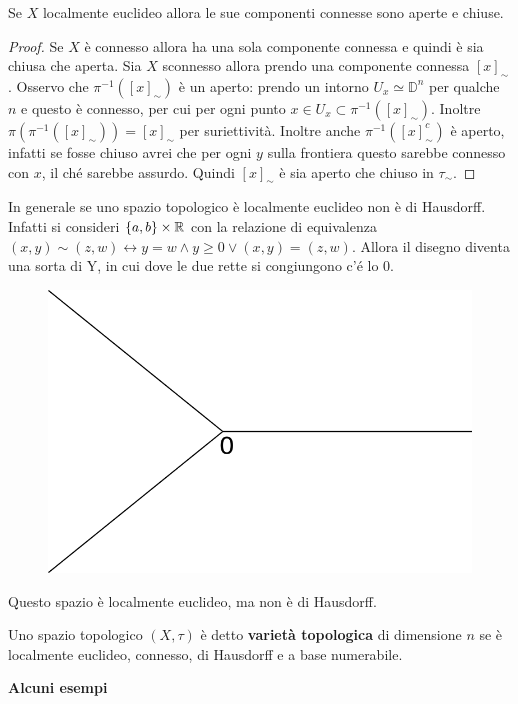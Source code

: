 \begin{theorem}
	Se $X$ localmente euclideo allora le sue componenti connesse sono aperte e chiuse.
\end{theorem}
\begin{proof}
	Se $X$ è connesso allora ha una sola componente connessa e quindi è sia chiusa che aperta.
	Sia $X$ sconnesso allora prendo una componente connessa $\left[x\right]_\sim$. Osservo che $\pi^{-1}(\left[x\right]_\sim)$ è un aperto: prendo un intorno $U_x \simeq \mathbb{D}^n$ per qualche $n$ e questo è connesso, per cui per ogni punto $x \in U_x \subset \pi^{-1}(\left[x\right]_\sim)$. Inoltre $\pi(\pi^{-1}(\left[x\right]_\sim)) = \left[x\right]_\sim$ per suriettività. Inoltre anche $\pi^{-1}(\left[x\right]^c_\sim)$ è aperto, infatti se fosse chiuso avrei che per ogni $y$ sulla frontiera questo sarebbe connesso con $x$, il ché sarebbe assurdo. Quindi $\left[x\right]_\sim$ è sia aperto che chiuso in $\tau_\sim$.
\end{proof}

\begin{remark}
	In generale se uno spazio topologico è localmente euclideo non è di Hausdorff. Infatti si consideri $\{a,b\} \times \mathbb{R}$ con la relazione di equivalenza $(x,y) \sim (z,w) \leftrightarrow y = w \land y \ge 0 \lor (x,y) = (z,w)$. Allora il disegno diventa una sorta di Y, in cui dove le due rette si congiungono c'é lo 0.
	\begin{figure}[h]
		\centering
		\includegraphics[width=0.35\linewidth]{images/topologia_generale/lcleucnott2}
		\caption{}
		\label{fig:lcleucnott2}
	\end{figure}
	
	Questo spazio è localmente euclideo, ma non è di Hausdorff.
\end{remark}

\begin{definition}
	Uno spazio topologico $(X,\tau)$ è detto \textbf{varietà topologica} di dimensione $n$ se è localmente euclideo, connesso, di Hausdorff e a base numerabile.
\end{definition}

\textbf{Alcuni esempi}

